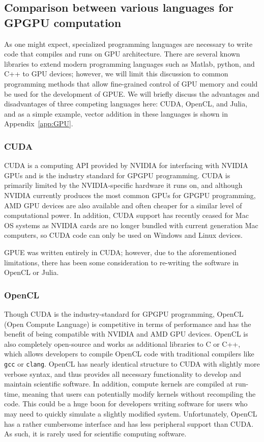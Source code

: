 \subsection{Comparison between various languages for GPGPU computation}
\label{sec:compare}

As one might expect, specialized programming languages are necessary to write code that compiles and runs on GPU architecture.
There are several known libraries to extend modern programming languages such as Matlab, python, and C++ to GPU devices; however, we will limit this discussion to common programming methods that allow fine-grained control of GPU memory and could be used for the development of GPUE.
We will briefly discuss the advantages and disadvantages of three competing languages here: CUDA, OpenCL, and Julia, and as a simple example, vector addition in these languages is shown in  Appendix~\ref{app:GPU}.

\subsubsection{CUDA}
CUDA is a computing API provided by NVIDIA for interfacing with NVIDIA GPUs and is the industry standard for GPGPU programming.
CUDA is primarily limited by the NVIDIA-specific hardware it runs on, and although NVIDIA currently produces the most common GPUs for GPGPU programming, AMD GPU devices are also available and often cheaper for a similar level of computational power.
In addition, CUDA support has recently ceased for Mac OS systems as NVIDIA cards are no longer bundled with current generation Mac computers, so CUDA code can only be used on Windows and Linux devices.

GPUE was written entirely in CUDA; however, due to the aforementioned limitations, there has been some consideration to re-writing the software in OpenCL or Julia.

\subsubsection{OpenCL}

Though CUDA is the industry-standard for GPGPU programming, OpenCL (Open Compute Language) is competitive in terms of performance and has the benefit of being compatible with NVIDIA and AMD GPU devices.
OpenCL is also completely open-source and works as additional libraries to C or C++, which allows developers to compile OpenCL code with traditional compilers like \texttt{gcc} or \texttt{clang}.
OpenCL has nearly identical structure to CUDA with slightly more verbose syntax, and thus provides all necessary functionality to develop and maintain scientific software.
In addition, compute kernels are compiled at run-time, meaning that users can potentially modify kernels without recompiling the code.
This could be a huge boon for developers writing software for users who may need to quickly simulate a slightly modified system.
Unfortunately, OpenCL has a rather cumbersome interface and has less peripheral support than CUDA.
As such, it is rarely used for scientific computing software.

